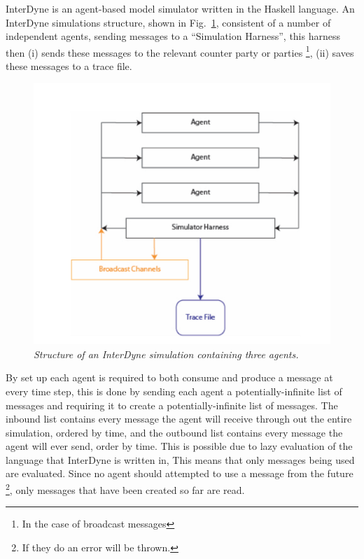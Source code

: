 \documentclass{article}
\begin{document}
InterDyne is an agent-based model simulator written in the Haskell language. An InterDyne simulations structure, shown in Fig.~\ref{fig:harness_setupfigure}, consistent of a number of independent agents, sending messages to a ``Simulation Harness'', this harness then (i) sends these messages to the relevant counter party or parties \footnote{In the case of broadcast messages}, (ii) saves these messages to a trace file.   
\begin{figure}[H]
	\centering
	\includegraphics[scale=0.5]{harness_setup}
	\caption{\it Structure of an InterDyne simulation containing three agents.}
	\label{fig:harness_setupfigure}
\end{figure} 
By set up each agent is required to both consume and produce a message at every time step, this is done by sending each agent a potentially-infinite list of messages and requiring it to create a potentially-infinite list of messages. The inbound list contains every message the agent will receive through out the entire simulation, ordered by time, and the outbound list contains every message the agent will ever send, order by time. This is possible due to lazy evaluation of the language that InterDyne is written in, This means that only messages being used are evaluated. Since no agent should attempted to use a message from the future \footnote{If they do an error will be thrown.}, only messages that have been created so far are read.\\
\end{document}
